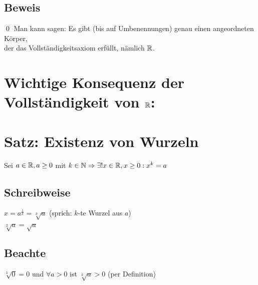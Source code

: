 \subsection*{Beweis}
 \qed \nl
Man kann sagen: Es gibt (bis auf Umbenennungen) genau einen angeordneten Körper,\\
der das Vollständigkeitsaxiom erfüllt, nämlich $\mathbb{R}$.

\newpage

\section*{\texorpdfstring{Wichtige Konsequenz der Vollständigkeit von $\mathbb{R}$:}{Wichtige Konsequenz der Vollständigkeit von \R:}}
\section{Satz: Existenz von Wurzeln}\label{3.16}
Sei $a \in \mathbb{R}, a \ge 0$ mit $k \in \mathbb{N} \Rightarrow \exists! x \in \mathbb{R} , x \ge 0 : x^k = a$

\subsection*{Schreibweise}
$x=a^{\frac{1}{k}} = \sqrt[k]{a}$ (sprich: $k$-te Wurzel aus $a$)\\
$\sqrt[2]{a} = \sqrt{a}$

\subsection*{Beachte}
$\sqrt[k]{0}=0$ und $\forall a>0$ ist $\sqrt[k]{a}>0$ (per Definition)

